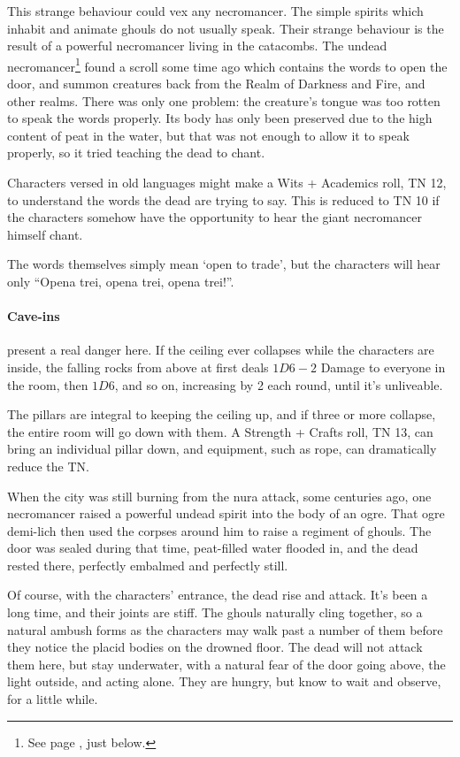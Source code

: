 \begin{multicols}{2}
This strange behaviour could vex any necromancer.
The simple spirits which inhabit and animate ghouls do not usually speak.
Their strange behaviour is the result of a powerful necromancer living in the catacombs.
The undead necromancer\footnote{See page \pageref{undead_ogre}, just below.} found a scroll some time ago which contains the words to open the door, and summon creatures back from the Realm of Darkness and Fire, and other realms.
There was only one problem: the creature's tongue was too rotten to speak the words properly.
Its body has only been preserved due to the high content of peat in the water, but that was not enough to allow it to speak properly, so it tried teaching the dead to chant.


Characters versed in old languages might make a Wits + Academics roll, TN 12, to understand the words the dead are trying to say.  This is reduced to TN 10 if the characters somehow have the opportunity to hear the giant necromancer himself chant.

The words themselves simply mean `open to trade', but the characters will hear only ``Opena trei, opena trei, opena trei!''.

\paragraph{Cave-ins} present a real danger here.  If the ceiling ever collapses while the characters are inside, the falling rocks from above at first deals $1D6-2$ Damage to everyone in the room, then $1D6$, and so on, increasing by 2 each round, until it's unliveable.


The pillars are integral to keeping the ceiling up, and if three or more collapse, the entire room will go down with them.  A Strength + Crafts roll, TN 13, can bring an individual pillar down, and equipment, such as rope, can dramatically reduce the TN.

When the city was still burning from the nura attack, some centuries ago, one necromancer raised a powerful undead spirit into the body of an ogre.
That ogre demi-lich then used the corpses around him to raise a regiment of ghouls.
The door was sealed during that time, peat-filled water flooded in, and the dead rested there, perfectly embalmed and perfectly still.

Of course, with the characters' entrance, the dead rise and attack.  It's been a long time, and their joints are stiff.  The ghouls naturally cling together, so a natural ambush forms as the characters may walk past a number of them before they notice the placid bodies on the drowned floor.  The dead will not attack them here, but stay underwater, with a natural fear of the door going above, the light outside, and acting alone.  They are hungry, but know to wait and observe, for a little while.


\end{multicols}
